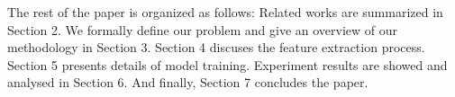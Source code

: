 The rest of the paper is organized as follows: Related works are summarized in Section 2. We formally define our problem and give an overview of our methodology in Section 3. Section 4 discuses the feature extraction process. Section 5 presents details of model training. Experiment results are showed and analysed in Section 6. And finally, Section 7 concludes the paper.
